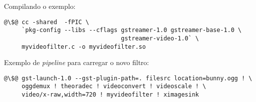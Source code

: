 

Compilando o exemplo:
\begin{lstlisting}[style=command]
@\$@ cc -shared  -fPIC \
     `pkg-config --libs --cflags gstreamer-1.0 gstreamer-base-1.0 \
                                 gstreamer-video-1.0` \
     myvideofilter.c -o myvideofilter.so
\end{lstlisting}

Exemplo de \emph{pipeline} para carregar o novo filtro: 
\begin{lstlisting}[style=command]
@\$@ gst-launch-1.0 --gst-plugin-path=. filesrc location=bunny.ogg ! \
     oggdemux ! theoradec ! videoconvert ! videoscale ! \
     video/x-raw,width=720 ! myvideofilter ! ximagesink
\end{lstlisting}


